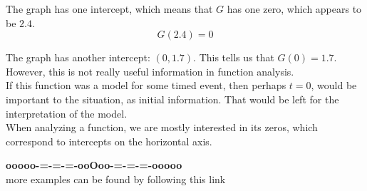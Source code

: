 \documentclass{ximera}
\begin{document}
The graph has one intercept, which means that $G$ has one zero, which appears to be $2.4$. \\

\[  G(2.4) = 0  \]




The graph has another intercept: $(0, 1.7)$. This tells us that $G(0)=1.7$.  However, this is not really useful information in function analysis. \\


If this function was a model for some timed event, then perhaps $t = 0$, would be important to the situation, as initial information.  That would be left for the interpretation of the model. \\

When analyzing a function, we are mostly interested in its zeros, which correspond to intercepts on the horizontal axis.






















\begin{onlineOnly}
\begin{center}
\textbf{\textcolor{green!50!black}{ooooo-=-=-=-ooOoo-=-=-=-ooooo}} \\

more examples can be found by following this link\\ 

\end{center}
\end{onlineOnly}
\end{document}
